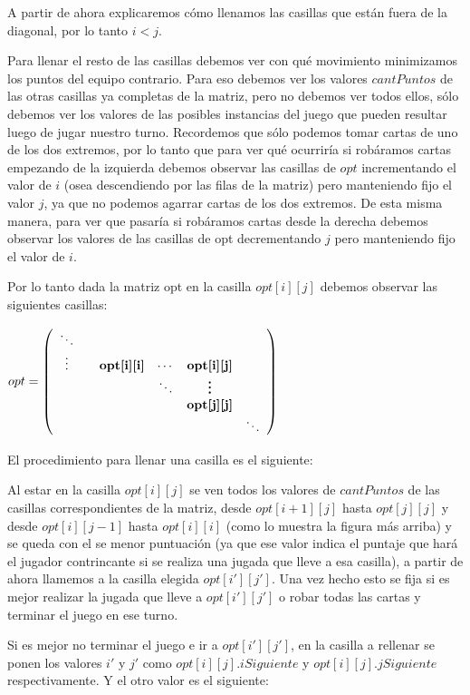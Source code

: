 A partir de ahora explicaremos cómo llenamos las casillas que están fuera de la diagonal, por lo tanto $i < j$.

Para llenar el resto de las casillas debemos ver con qué movimiento minimizamos los puntos del equipo contrario. Para eso debemos ver los valores $cantPuntos$ de las otras casillas ya completas de la matriz, pero no debemos ver todos ellos, sólo debemos ver los valores de las posibles instancias del juego que pueden resultar luego de jugar nuestro turno. Recordemos que sólo podemos tomar cartas de uno de los dos extremos, por lo tanto que para ver qué ocurriría si robáramos cartas empezando de la izquierda debemos observar las casillas de $opt$ incrementando el valor de $i$ (osea descendiendo por las filas de la matriz) pero manteniendo fijo el valor $j$, ya que no podemos agarrar cartas de los dos extremos. De esta misma manera, para ver que pasaría si robáramos cartas desde la derecha debemos observar los valores de las casillas de opt decrementando $j$ pero manteniendo fijo el valor de $i$.

Por lo tanto dada la matriz opt en la casilla $opt[i][j]$ debemos observar las siguientes casillas:

$opt= \left(
\begin{array}{cccccc}
 \ddots & & & & \\ 
 \vdots & & \textbf{opt[i][i]} & \cdots & \textbf{opt[i][j]} \\
 & & & \ddots & \textbf{\vdots} & \\
 & & & & \textbf{opt[j][j]} &\\
 & & & & & \ddots \\
 
\end{array}
\right)$

El procedimiento para llenar una casilla es el siguiente:

Al estar en la casilla $opt[i][j]$ se ven todos los valores de $cantPuntos$ de las casillas correspondientes de la matriz, desde $opt[i+1][j]$ hasta $opt[j][j]$ y desde $opt[i][j-1]$ hasta $opt[i][i]$ (como lo muestra la figura más arriba) y se queda con el se menor puntuación (ya que ese valor indica el puntaje que hará el jugador contrincante si se realiza una jugada que lleve a esa casilla), a partir de ahora llamemos a la casilla elegida $opt[i'][j']$. Una vez hecho esto se fija si es mejor realizar la jugada que lleve a $opt[i'][j']$ o robar todas las cartas y terminar el juego en ese turno. 

Si es mejor no terminar el juego e ir a $opt[i'][j']$,  en la casilla a rellenar se ponen los valores $i'$ y $j'$ como $opt[i][j].iSiguiente$ y $opt[i][j].jSiguiente$ respectivamente. Y el otro valor es el siguiente:

